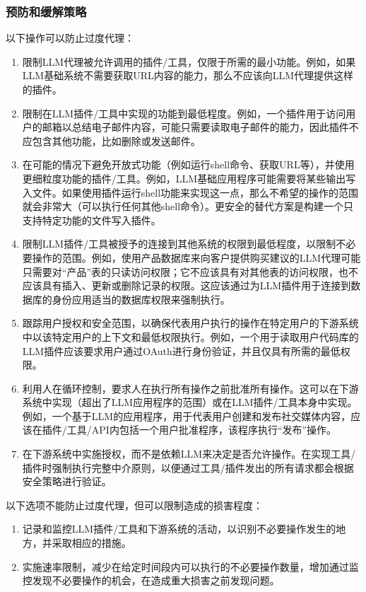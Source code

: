 \documentclass[
]{article}
\providecommand{\tightlist}{%
  \setlength{\itemsep}{0pt}\setlength{\parskip}{0pt}}
\begin{document}
\subsubsection{预防和缓解策略}\label{ux9884ux9632ux548cux7f13ux89e3ux7b56ux7565}

以下操作可以防止过度代理：

\begin{enumerate}
\def\labelenumi{\arabic{enumi}.}
\tightlist
\item
  限制LLM代理被允许调用的插件/工具，仅限于所需的最小功能。例如，如果LLM基础系统不需要获取URL内容的能力，那么不应该向LLM代理提供这样的插件。
\item
  限制在LLM插件/工具中实现的功能到最低程度。例如，一个插件用于访问用户的邮箱以总结电子邮件内容，可能只需要读取电子邮件的能力，因此插件不应包含其他功能，比如删除或发送邮件。
\item
  在可能的情况下避免开放式功能（例如运行shell命令、获取URL等），并使用更细粒度功能的插件/工具。例如，LLM基础应用程序可能需要将某些输出写入文件。如果使用插件运行shell功能来实现这一点，那么不希望的操作的范围就会非常大（可以执行任何其他shell命令）。更安全的替代方案是构建一个只支持特定功能的文件写入插件。
\item
  限制LLM插件/工具被授予的连接到其他系统的权限到最低程度，以限制不必要操作的范围。例如，使用产品数据库来向客户提供购买建议的LLM代理可能只需要对``产品''表的只读访问权限；它不应该具有对其他表的访问权限，也不应该具有插入、更新或删除记录的权限。这应该通过为LLM插件用于连接到数据库的身份应用适当的数据库权限来强制执行。
\item
  跟踪用户授权和安全范围，以确保代表用户执行的操作在特定用户的下游系统中以该特定用户的上下文和最低权限执行。例如，一个用于读取用户代码库的LLM插件应该要求用户通过OAuth进行身份验证，并且仅具有所需的最低权限。
\item
  利用人在循环控制，要求人在执行所有操作之前批准所有操作。这可以在下游系统中实现（超出了LLM应用程序的范围）或在LLM插件/工具本身中实现。例如，一个基于LLM的应用程序，用于代表用户创建和发布社交媒体内容，应该在插件/工具/API内包括一个用户批准程序，该程序执行``发布''操作。
\item
  在下游系统中实施授权，而不是依赖LLM来决定是否允许操作。在实现工具/插件时强制执行完整中介原则，以便通过工具/插件发出的所有请求都会根据安全策略进行验证。
\end{enumerate}

以下选项不能防止过度代理，但可以限制造成的损害程度：

\begin{enumerate}
\def\labelenumi{\arabic{enumi}.}
\tightlist
\item
  记录和监控LLM插件/工具和下游系统的活动，以识别不必要操作发生的地方，并采取相应的措施。
\item
  实施速率限制，减少在给定时间段内可以执行的不必要操作数量，增加通过监控发现不必要操作的机会，在造成重大损害之前发现问题。
\end{enumerate}
\end{document}

